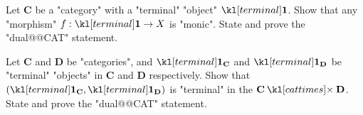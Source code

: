 \documentclass[main.tex]{subfiles}
\begin{document}
\begin{exer}\label{exer:duality:morterminal}
	Let $\mathbf{C}$ be a "category" with a "terminal" "object" $\terminal$. Show that any "morphism" $f: \terminal \rightarrow X$ is "monic". State and prove the "dual@@CAT" statement.
\end{exer}
\begin{exer}\label{exer:duality:productterminal}
	Let $\mathbf{C}$ and $\mathbf{D}$ be "categories", and $\terminal_{\mathbf{C}}$ and $\terminal_{\mathbf{D}}$ be "terminal" "objects" in $\mathbf{C}$ and $\mathbf{D}$ respectively. Show that $(\terminal_{\mathbf{C}},\terminal_{\mathbf{D}})$ is "terminal" in the $\mathbf{C} \cattimes \mathbf{D}$. State and prove the "dual@@CAT" statement.
\end{exer}
\end{document}
